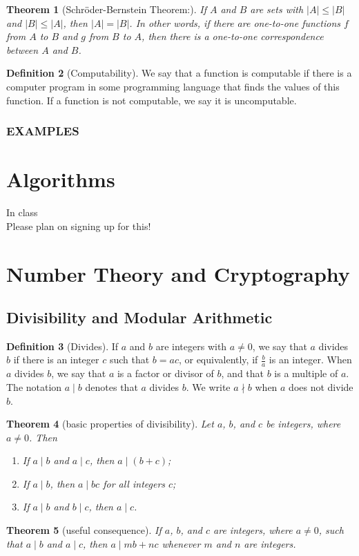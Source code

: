\documentclass[letterpaper,10pt]{article}
\theoremstyle{plain}
\newtheorem{thm}{Theorem}[section]
\theoremstyle{definition}
\newtheorem{defn}[thm]{Definition}
\theoremstyle{remark}
\begin{document}
\begin{thm}[Schröder-Bernstein Theorem:] If $A$ and $B$ are sets with $|A| \leq |B|$ and $|B| \leq |A|$, then $|A| = |B|$. In other words, if there are one-to-one functions $f$ from $A$ to $B$ and $g$ from $B$ to $A$, then there is a one-to-one correspondence between $A$ and $B$.
\end{thm}
\begin{defn}[Computability]
We say that a function is computable if there is a computer program in some programming language that finds the values of this function. If a function is not computable, we say it is uncomputable.

\end{defn}
\newpage
\subsubsection{EXAMPLES}
\newpage
\section{Algorithms}
In class
\\
Please plan on signing up for this!
\section{Number Theory and Cryptography}
\subsection{Divisibility and Modular Arithmetic}
\begin{defn}[Divides]
If \(a\) and \(b\) are integers with \(a \neq 0\), we say that \(a\) divides \(b\) if there is an integer \(c\) such that \(b = ac\), or equivalently, if \(\frac{b}{a}\) is an integer. When \(a\) divides \(b\), we say that \(a\) is a factor or divisor of \(b\), and that \(b\) is a multiple of \(a\). The notation \(a \mid b\) denotes that \(a\) divides \(b\). We write \(a \nmid b\) when \(a\) does not divide \(b\).

\end{defn}
\begin{thm}[basic properties of divisibility]
Let \(a\), \(b\), and \(c\) be integers, where \(a \neq 0\). Then
\begin{enumerate}
    \item[(i)] If \(a \mid b\) and \(a \mid c\), then \(a \mid (b + c)\);
    \item[(ii)] If \(a \mid b\), then \(a \mid bc\) for all integers \(c\);
    \item[(iii)] If \(a \mid b\) and \(b \mid c\), then \(a \mid c\).
\end{enumerate}

\end{thm}
\begin{thm}[useful consequence]
If \(a\), \(b\), and \(c\) are integers, where \(a \neq 0\), such that \(a \mid b\) and \(a \mid c\), then \(a \mid mb + nc\) whenever \(m\) and \(n\) are integers.


\end{thm}
\end{document}
